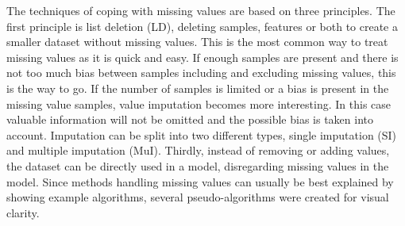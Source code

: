 \documentclass[10pt,a4paper]{report}
\begin{document}
	The techniques of coping with missing values are based on three principles. The first principle is list deletion (LD)\cite{donders2006gentle, haukoos2007advanced}, deleting samples, features or both to create a smaller dataset without missing values. This is the most common way to treat missing values as it is quick and easy. If enough samples are present and there is not too much bias between samples including and excluding missing values, this is the way to go. If the number of samples is limited or a bias is present in the missing value samples, value imputation becomes more interesting. In this case valuable information will not be omitted and the possible bias is taken into account. Imputation can be split into two different types, single imputation (SI)\cite{donders2006gentle, cartwright2003dealing, haukoos2007advanced} and multiple imputation (MuI)\cite{donders2006gentle, patrician2002multiple, sterne2009multiple}. Thirdly, instead of removing or adding values, the dataset can be directly used in a model, disregarding missing values in the model\cite{myrtveit2001analyzing}. Since methods handling missing values can usually be best explained by showing example algorithms, several pseudo-algorithms were created for visual clarity.
	
	
	
	
	
	
	
	
	
	
	
	
\end{document}
